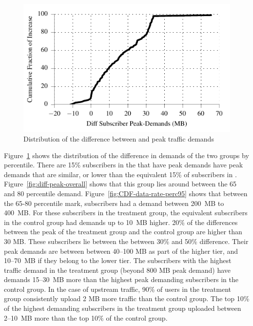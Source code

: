 \begin{figure}[t]
\centering
\includegraphics[width=\linewidth]{figures/cdf_diff_perc95_bytes_subsc-overall.pdf}
               \caption{Distribution of the difference between \treatment{} and \control{}
               peak traffic demands\label{fig:cdf-diff-perc95}}
\end{figure}

Figure~\ref{fig:cdf-diff-perc95} shows the distribution of the
difference in demands of the two groups by percentile. There are 15\%
subscribers in the \treatment{} that have peak demands have peak demands
that are similar, or lower than the equivalent 15\% of subscribers in
\control{}. Figure~\ref{fig:diff-peak-overall} shows that this group
lies around between the 65 and 80 percentile
demand. Figure~\ref{fig:CDF-data-rate-perc95} shows that between the
65-80 percentile mark, subscribers had a demand between 200~MB to
400~MB. For these subscribers in the treatment group, the equivalent
subscribers in the control group had demands up to 10~MB higher. 20\% of the
differences between the peak of the treatment group and the control
group are higher than 30 MB. These subscribers lie between the between
30\% and 50\% difference. Their peak demands are between between 40--100
MB as part of the higher tier, and 10--70~MB if they belong to the lower
tier.  The subscribers with the highest traffic demand in the treatment
group (beyond 800 MB peak demand) have demands 15--30~MB more than the
highest peak demanding subscribers in the control group.  In the case of
upstream traffic, 90\% of users in the treatment group consistently
upload 2 MB more traffic than the control group. The top 10\% of the
highest demanding subscribers in the treatment group uploaded between 2--10~MB
more than the top 10\% of the control group.
\fi

